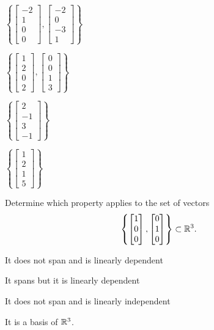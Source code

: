 \begin{readinessAssuranceTest}
\begin{multicols}{4}
\begin{readinessAssuranceTestChoices}
\item $\left\{ \begin{bmatrix} -2 \\ 1 \\ 0 \\ 0 \end{bmatrix}, \begin{bmatrix} -2 \\ 0 \\ -3 \\ 1 \end{bmatrix} \right\}$%
\item $\left\{ \begin{bmatrix} 1 \\ 2 \\ 0 \\ 2 \end{bmatrix}, \begin{bmatrix} 0 \\ 0 \\ 1 \\ 3 \end{bmatrix} \right\}$
\item $\left\{ \begin{bmatrix} 2 \\ -1 \\ 3 \\ -1 \end{bmatrix} \right\}$
\item $\left\{ \begin{bmatrix} 1 \\ 2 \\ 1 \\ 5 \end{bmatrix} \right\}$
\end{readinessAssuranceTestChoices}
\end{multicols}


\item Determine which property applies to the set of vectors $$\left\{ \begin{bmatrix}  1 \\ 0 \\ 0 \end{bmatrix}, \begin{bmatrix} 0 \\ 1 \\ 0 \end{bmatrix} \right\} \subset \mathbb{R}^3.$$
\begin{readinessAssuranceTestChoices}
\item It does not span and is linearly dependent
\item It spans but it is linearly dependent
\item It does not span and is linearly independent %
\item It is a basis of $\mathbb{R}^3$.
\end{readinessAssuranceTestChoices}



\end{readinessAssuranceTest}
